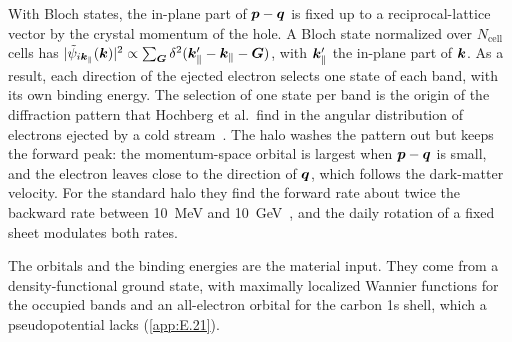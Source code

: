 With Bloch states, the in-plane part of $\bm{p} - \bm{q}$ is fixed up to a reciprocal-lattice vector by the crystal momentum of the hole. A Bloch state normalized over $N_{\mathrm{cell}}$ cells has $|\tilde\psi_{i\bm{k}_\parallel}(\bm{k})|^2 \propto \sum_{\bm{G}}\delta^2(\bm{k}_\parallel' - \bm{k}_\parallel - \bm{G})$, with $\bm{k}_\parallel'$ the in-plane part of $\bm{k}$. As a result, each direction of the ejected electron selects one state of each band, with its own binding energy. The selection of one state per band is the origin of the diffraction pattern that Hochberg et al.\ find in the angular distribution of electrons ejected by a cold stream~\cite[Sect.~III]{hochberg2017directional}. The halo washes the pattern out but keeps the forward peak: the momentum-space orbital is largest when $\bm{p} - \bm{q}$ is small, and the electron leaves close to the direction of $\bm{q}$, which follows the dark-matter velocity. For the standard halo they find the forward rate about twice the backward rate between \SI{10}{MeV} and \SI{10}{GeV}~\cite[Sect.~III]{hochberg2017directional}, and the daily rotation of a fixed sheet modulates both rates.

The orbitals and the binding energies are the material input. They come from a density-functional ground state, with maximally localized Wannier functions for the occupied bands and an all-electron orbital for the carbon 1s shell, which a pseudopotential lacks (\cref{app:E.21}).

